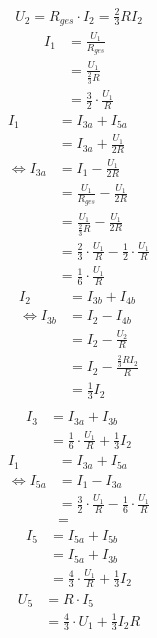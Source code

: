 \documentclass{article}
\begin{document}
\begin{align*}
    U_2 = R_{ges}\cdot I_2 = \frac{2}{3}R I_2
\end{align*}
\begin{align*}
    I_1 &= \frac{U_1}{R_{ges}}\\
    &= \frac{U_1}{\frac{2}{3}R}\\
    &= \frac{3}{2}\cdot\frac{U_1}{R}
\end{align*}
\begin{align*}
    I_1 &= I_{3a} + I_{5a}\\
    &= I_{3a} + \frac{U_1}{2R}\\
    \Leftrightarrow I_{3a}&= I_1 - \frac{U_1}{2R}\\
    &= \frac{U_1}{R_{ges}} - \frac{U_1}{2R}\\
    &= \frac{U_1}{\frac{2}{3}R} - \frac{U_1}{2R}\\
    &= \frac{2}{3}\cdot \frac{U_1}{R} - \frac{1}{2}\cdot \frac{U_1}{R}\\
    &= \frac{1}{6}\cdot\frac{U_1}{R}
\end{align*}
\begin{align*}
    I_2 &= I_{3b} + I_{4b}\\
    \Leftrightarrow I_{3b} &= I_2 - I_{4b}\\
    &= I_2 - \frac{U_2}{R}\\
    &= I_2 - \frac{\frac{2}{3}RI_2}{R}\\
    &= \frac{1}{3}I_2\\
\end{align*}
\begin{align*}
    I_3 &= I_{3a} + I_{3b}\\
    &= \frac{1}{6}\cdot \frac{U_1}{R}+\frac{1}{3}I_2
\end{align*}
\begin{align*}
    I_1 &= I_{3a}+I_{5a}\\
    \Leftrightarrow I_{5a}&=I_1-I_{3a}\\
    &= \frac{3}{2}\cdot\frac{U_1}{R}-\frac{1}{6}\cdot\frac{U_1}{R}\\
    &=
\end{align*}
\begin{align*}
    I_5 &= I_{5a} + I_{5b}\\
    &= I_{5a} + I_{3b}\\
    &=\frac{4}{3}\cdot\frac{U_1}{R} + \frac{1}{3}I_2
\end{align*}
\begin{align*}
    U_5 &= R\cdot I_5\\
    &=\frac{4}{3}\cdot U_1 + \frac{1}{3}I_2R
\end{align*}
\end{document}
